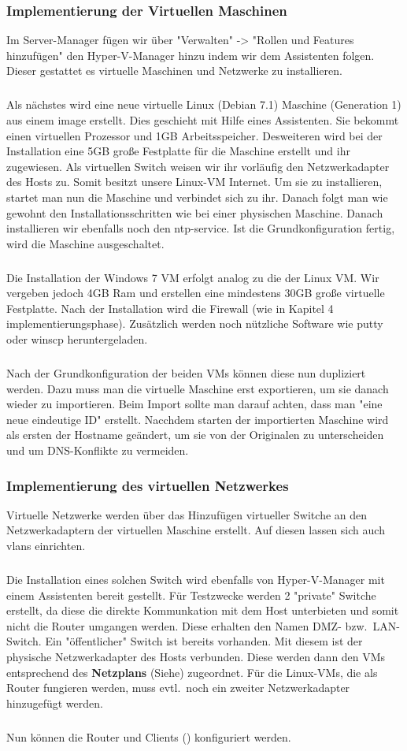 \subsubsection{Implementierung der Virtuellen Maschinen}
Im Server-Manager fügen wir über "Verwalten" -> "Rollen und Features hinzufügen" den Hyper-V-Manager hinzu indem wir dem Assistenten folgen. Dieser gestattet es virtuelle Maschinen und Netzwerke zu installieren.
\subparagraph*{} Als nächstes wird eine neue virtuelle Linux (Debian 7.1)  Maschine (Generation 1) aus einem image erstellt. Dies geschieht mit Hilfe eines Assistenten. Sie bekommt einen virtuellen Prozessor und 1GB Arbeitsspeicher. Desweiteren wird bei der Installation eine 5GB große Festplatte für die Maschine erstellt und ihr zugewiesen. Als virtuellen Switch weisen wir ihr vorläufig den Netzwerkadapter des Hosts zu. Somit besitzt unsere Linux-VM Internet. Um sie zu installieren, startet man nun die Maschine und verbindet sich zu ihr. Danach folgt man wie gewohnt den Installationsschritten wie bei einer physischen Maschine. Danach installieren wir ebenfalls noch den ntp-service. Ist die Grundkonfiguration fertig, wird die Maschine ausgeschaltet.
\subparagraph*{} Die Installation der Windows 7 VM erfolgt analog zu die der Linux VM. Wir vergeben jedoch 4GB Ram und erstellen eine mindestens 30GB große virtuelle Festplatte. Nach der Installation wird die Firewall (wie in Kapitel 4 implementierungsphase). Zusätzlich werden noch nützliche Software wie putty oder winscp heruntergeladen.
\subparagraph*{} Nach der Grundkonfiguration der beiden VMs können diese nun dupliziert werden. Dazu muss man die virtuelle Maschine erst exportieren, um sie danach wieder zu importieren. Beim Import sollte man darauf achten, dass man "eine neue eindeutige ID" erstellt. Nacchdem starten der importierten Maschine wird als ersten der Hostname geändert, um sie von der Originalen zu unterscheiden und um DNS-Konflikte zu vermeiden.
\subsubsection{Implementierung des virtuellen Netzwerkes}
Virtuelle Netzwerke werden über das Hinzufügen virtueller Switche an den Netzwerkadaptern der virtuellen Maschine erstellt. Auf diesen lassen sich auch vlans einrichten.
\subparagraph*{} Die Installation eines solchen Switch wird ebenfalls von Hyper-V-Manager mit einem Assistenten bereit gestellt. Für Testzwecke werden 2 "private" Switche erstellt, da diese die direkte Kommunkation mit dem Host unterbieten und somit nicht die Router umgangen werden. Diese erhalten den Namen DMZ- bzw.\ LAN-Switch. Ein "öffentlicher" Switch ist bereits vorhanden. Mit diesem ist der physische Netzwerkadapter des Hosts verbunden. Diese werden dann den VMs entsprechend des \textbf{Netzplans} (Siehe) zugeordnet. Für die Linux-VMs, die als Router fungieren werden, muss evtl.\ noch ein zweiter Netzwerkadapter hinzugefügt werden.
\subparagraph*{} Nun können die Router und Clients () konfiguriert werden.
